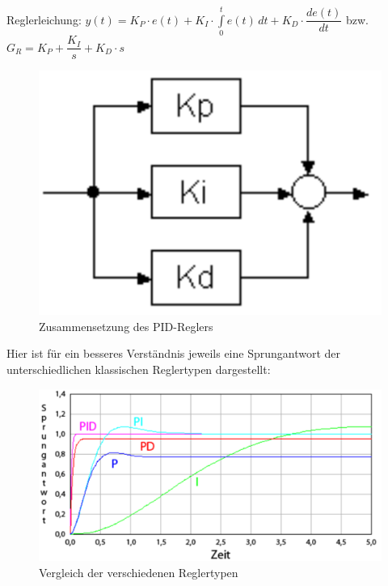 Reglerleichung: \hspace{3mm} $y(t) = K_P \cdot e(t) + K_I \cdot \int\limits_{0}^{t} e(t) \,dt + K_D \cdot \dfrac{de(t)}{dt}$ \hspace{3mm} bzw. \hspace{3mm} $G_R = K_P + \dfrac{K_I}{s} + K_D \cdot s$

\begin{figure}[H]
	\begin{center}
		\includegraphics[scale=0.15]{figures/antrieb/PID_Regler.png}
		\caption{Zusammensetzung des PID-Reglers}
	\end{center}
\end{figure}

Hier ist für ein besseres Verständnis jeweils eine Sprungantwort der unterschiedlichen klassischen Reglertypen dargestellt:
 
\begin{figure}[H]
	\begin{center}
		\includegraphics[scale=0.3]{figures/antrieb/Reglertypen.png}
		\caption{Vergleich der verschiedenen Reglertypen}
	\end{center}
\end{figure}
\newpage

